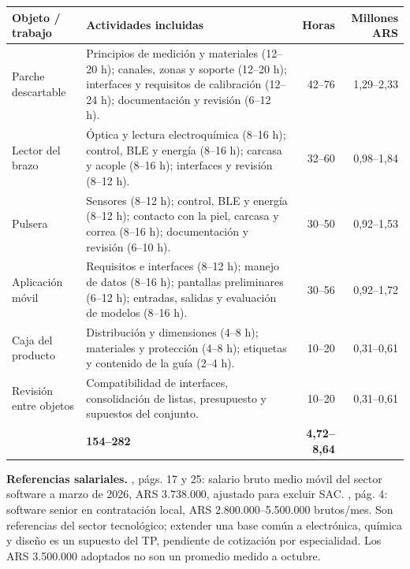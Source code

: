 \documentclass[11pt,a4paper]{article}
\begin{document}
\noindent\begin{tabularx}{\linewidth}{@{}>{\raggedright\arraybackslash}p{2.4cm}>{\raggedright\arraybackslash}X r r@{}}
\toprule
\textbf{Objeto / trabajo} & \textbf{Actividades incluidas} & \textbf{Horas} & \textbf{Millones ARS}\\
\midrule
Parche descartable & Principios de medición y materiales (12--20 h); canales, zonas y soporte (12--20 h); interfaces y requisitos de calibración (12--24 h); documentación y revisión (6--12 h). & 42--76 & 1,29--2,33\\
\addlinespace
Lector del brazo & Óptica y lectura electroquímica (8--16 h); control, BLE y energía (8--16 h); carcasa y acople (8--16 h); interfaces y revisión (8--12 h). & 32--60 & 0,98--1,84\\
\addlinespace
Pulsera & Sensores (8--12 h); control, BLE y energía (8--12 h); contacto con la piel, carcasa y correa (8--16 h); documentación y revisión (6--10 h). & 30--50 & 0,92--1,53\\
\addlinespace
Aplicación móvil & Requisitos e interfaces (8--12 h); manejo de datos (8--16 h); pantallas preliminares (6--12 h); entradas, salidas y evaluación de modelos (8--16 h). & 30--56 & 0,92--1,72\\
\addlinespace
Caja del producto & Distribución y dimensiones (4--8 h); materiales y protección (4--8 h); etiquetas y contenido de la guía (2--4 h). & 10--20 & 0,31--0,61\\
\addlinespace
Revisión entre objetos & Compatibilidad de interfaces, consolidación de listas, presupuesto y supuestos del conjunto. & 10--20 & 0,31--0,61\\
\midrule
\multicolumn{2}{@{}l}{\textbf{Total de diseño conceptual}} & \textbf{154--282} & \textbf{4,72--8,64}\\
\bottomrule
\end{tabularx}

\textbf{Referencias salariales.} ,
págs. 17 y 25: salario bruto medio móvil del sector software a marzo de 2026,
ARS 3.738.000, ajustado para excluir SAC.
,
pág. 4: software senior en contratación local, ARS 2.800.000--5.500.000 brutos/mes.
Son referencias del sector tecnológico; extender una base común a electrónica,
química y diseño es un supuesto del TP, pendiente de cotización por especialidad.
Los ARS 3.500.000 adoptados no son un promedio medido a octubre.
\end{document}
